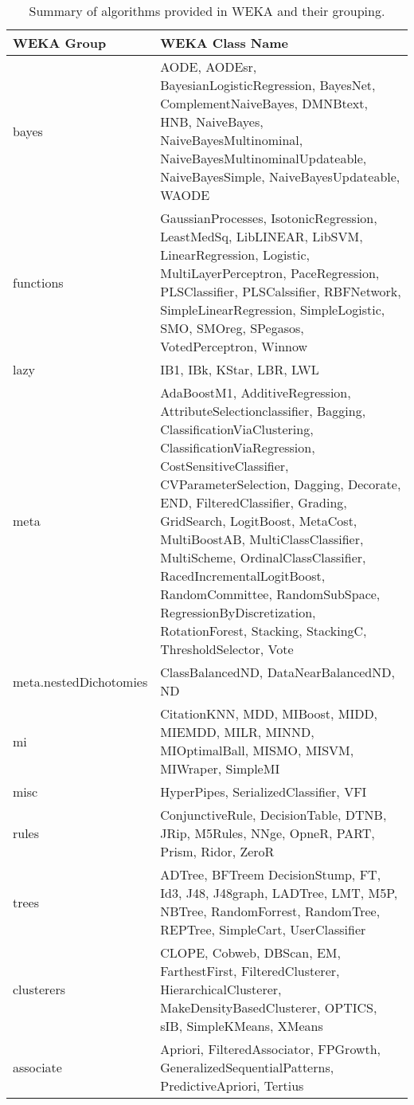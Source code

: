 \documentclass[a4paper, 11pt]{article}
\begin{document}
\begin{table}[ht]
	\centering\footnotesize
		\begin{tabularx}{\textwidth}{lX}
		\toprule
		\textbf{WEKA Group} & \textbf{WEKA Class Name} \\ 
		\toprule
		bayes & AODE, AODEsr, BayesianLogisticRegression, BayesNet, ComplementNaiveBayes, DMNBtext, HNB, NaiveBayes, NaiveBayesMultinominal, NaiveBayesMultinominalUpdateable, NaiveBayesSimple, NaiveBayesUpdateable, WAODE \\
		\midrule
		functions & GaussianProcesses, IsotonicRegression, LeastMedSq, LibLINEAR, LibSVM, LinearRegression, Logistic, MultiLayerPerceptron, PaceRegression, PLSClassifier, PLSCalssifier, RBFNetwork, SimpleLinearRegression, SimpleLogistic, SMO, SMOreg, SPegasos, VotedPerceptron, Winnow \\
		\midrule
		lazy & IB1, IBk, KStar, LBR, LWL \\
		\midrule
		meta & AdaBoostM1, AdditiveRegression, AttributeSelectionclassifier, Bagging, ClassificationViaClustering, ClassificationViaRegression, CostSensitiveClassifier, CVParameterSelection, Dagging, Decorate, END, FilteredClassifier, Grading, GridSearch, LogitBoost, MetaCost, MultiBoostAB, MultiClassClassifier, MultiScheme, OrdinalClassClassifier, RacedIncrementalLogitBoost, RandomCommittee, RandomSubSpace, RegressionByDiscretization, RotationForest, Stacking, StackingC, ThresholdSelector, Vote \\
		\midrule
		meta.nestedDichotomies & ClassBalancedND, DataNearBalancedND, ND \\
		\midrule
		mi & CitationKNN, MDD, MIBoost, MIDD, MIEMDD, MILR, MINND, MIOptimalBall, MISMO, MISVM, MIWraper, SimpleMI \\
		\midrule
		misc & HyperPipes, SerializedClassifier, VFI  \\
		\midrule
		rules & ConjunctiveRule, DecisionTable, DTNB, JRip, M5Rules, NNge, OpneR, PART, Prism, Ridor, ZeroR \\
		\midrule
		trees & ADTree, BFTreem DecisionStump, FT, Id3, J48, J48graph, LADTree, LMT, M5P, NBTree, RandomForrest, RandomTree, REPTree, SimpleCart, UserClassifier \\
		\midrule
		clusterers & CLOPE, Cobweb, DBScan, EM, FarthestFirst, FilteredClusterer, HierarchicalClusterer, MakeDensityBasedClusterer, OPTICS, sIB, SimpleKMeans, XMeans \\
		\midrule
		associate & Apriori, FilteredAssociator, FPGrowth, GeneralizedSequentialPatterns, PredictiveApriori, Tertius \\
		\bottomrule
		\end{tabularx}	
	\caption{Summary of algorithms provided in WEKA and their grouping.}
	\label{tab:weka}
\end{table}
\end{document}
